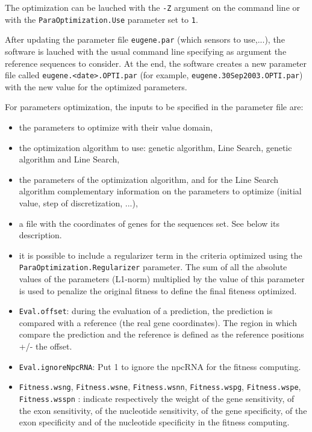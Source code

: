 \documentclass[a4paper,titlepage]{report}
\begin{document}
The optimization can be lauched with the \texttt{-Z} argument
 on the command line or
with the \texttt{ParaOptimi\-zation.Use} parameter set to \texttt{1}.

After updating the parameter file \texttt{eugene.par} (which sensors
to use,...), the software is lauched with the usual command line
specifying as argument the reference sequences to consider. At the
end, the software creates a new parameter file called
\texttt{eugene.<date>.OPTI.par} (for example,
\texttt{eugene.30Sep\-2003.OPTI.par}) with the new value for the
optimized parameters.

For parameters optimization, the inputs to be specified in the
parameter file are:
\begin{itemize}
\item the parameters to optimize with their value domain,
\item the optimization algorithm to use: genetic algorithm, Line
  Search, genetic algorithm and Line Search,
\item the parameters of the optimization algorithm, and for the Line
  Search algorithm complementary information on the parameters to
  optimize (initial value, step of discretization, ...),
\item a file with the coordinates of genes for the sequences set. See below its description.
\item it is possible to include a regularizer term in the criteria
  optimized using the \texttt{ParaOptimization.Regularizer} parameter.
  The sum of all the absolute values of the parameters (L1-norm)
  multiplied by the value of this parameter is used to penalize the
  original fitness to define the final fiteness optimized.
\item \texttt{Eval.offset}: during the evaluation of a prediction, the prediction is compared with a 
reference (the real gene coordinates). The region in which compare the prediction 
and the reference is defined as the reference positions +/- the offset.
\item \texttt{Eval.ignoreNpcRNA}: Put 1 to ignore the npcRNA for the fitness computing.
\item \texttt{Fitness.wsng}, \texttt{Fitness.wsne}, 
\texttt{Fitness.wsnn}, \texttt{Fitness.wspg}, 
\texttt{Fitness.wspe}, \texttt{Fitness.wsspn} : indicate respectively the weight of the gene sensitivity, of the exon sensitivity, 
of the nucleotide sensitivity, of the gene specificity, of the exon specificity 
and of the nucleotide specificity in the fitness computing.
\end{itemize}
\end{document}
